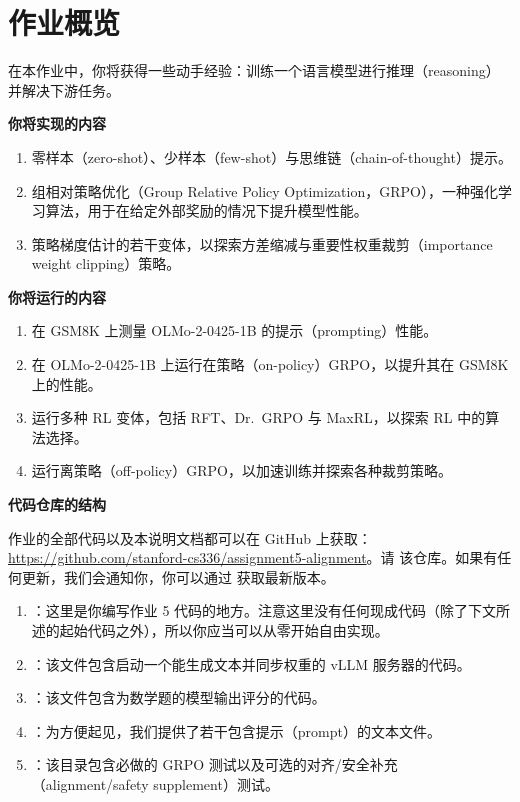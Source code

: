 
\section{作业概览}

在本作业中，你将获得一些动手经验：训练一个语言模型进行推理（reasoning）并解决下游任务。

\noindent\textbf{你将实现的内容}

\begin{enumerate}
  \item 零样本（zero-shot）、少样本（few-shot）与思维链（chain-of-thought）提示。
  \item 组相对策略优化（Group Relative Policy Optimization，GRPO），一种强化学习算法，用于在给定外部奖励的情况下提升模型性能。
  \item 策略梯度估计的若干变体，以探索方差缩减与重要性权重裁剪（importance weight clipping）策略。
\end{enumerate}

\noindent\textbf{你将运行的内容}

\begin{enumerate}
  \item 在 GSM8K 上测量 OLMo-2-0425-1B 的提示（prompting）性能。
  \item 在 OLMo-2-0425-1B 上运行在策略（on-policy）GRPO，以提升其在 GSM8K 上的性能。
  \item 运行多种 RL 变体，包括 RFT、Dr.\ GRPO 与 MaxRL，以探索 RL 中的算法选择。
  \item 运行离策略（off-policy）GRPO，以加速训练并探索各种裁剪策略。
\end{enumerate}

\noindent\textbf{代码仓库的结构}

{\sloppy 作业的全部代码以及本说明文档都可以在 GitHub 上获取：\url{https://github.com/stanford-cs336/assignment5-alignment}。请  该仓库。如果有任何更新，我们会通知你，你可以通过  获取最新版本。\par}

\begin{enumerate}
  \item {}：这里是你编写作业 5 代码的地方。注意这里没有任何现成代码（除了下文所述的起始代码之外），所以你应当可以从零开始自由实现。
  \item {}：该文件包含启动一个能生成文本并同步权重的 vLLM 服务器的代码。
  \item {}：该文件包含为数学题的模型输出评分的代码。
  \item {}：为方便起见，我们提供了若干包含提示（prompt）的文本文件。
  \item {}：该目录包含必做的 GRPO 测试以及可选的对齐/安全补充（alignment/safety supplement）测试。
\end{enumerate}

